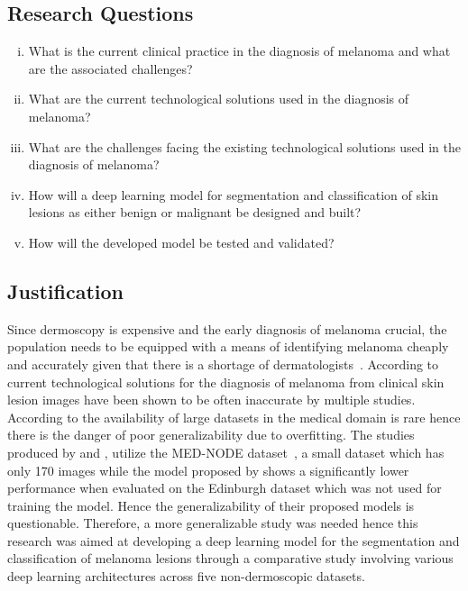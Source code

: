 \documentclass[12pt, a4paper]{article}
\begin{document}
\subsection{Research Questions}
\begin{enumerate}[(i)]
    \item What is the current clinical practice in the diagnosis of melanoma and what are the associated challenges?
    \item What are the current technological solutions used in the diagnosis of melanoma?
    \item What are the challenges facing the existing technological solutions used in the diagnosis of melanoma?
    \item How will a deep learning model for segmentation and classification of skin lesions as either benign or malignant be designed and built?
    \item How will the developed model be tested and validated?
\end{enumerate}
\subsection{Justification}
Since dermoscopy is expensive and the early diagnosis of melanoma crucial, the population needs to be equipped with a means of identifying melanoma cheaply and accurately given that there is a shortage of dermatologists~\citep{jones2019dermoscopy, davis2019current, giavina2020teledermatology}.
According to~\cite{davis2019current} current technological solutions for the diagnosis of melanoma from clinical skin lesion images have been shown to be often inaccurate by multiple studies. According to \cite{yoon2019generalizable} the availability of large datasets in the medical domain is rare hence there is the danger of poor generalizability due to overfitting. The studies produced by \cite{perez2021ensemble} and \cite{7590963}, utilize the MED-NODE dataset~\citep{giotis2015med}, a small dataset which has only 170 images while the model proposed by \cite{HAN20181529} shows a significantly lower performance when evaluated on the Edinburgh dataset which was not used for training the model. Hence the generalizability of their proposed models is questionable. Therefore, a more generalizable study was needed hence this research was aimed at developing a deep learning model for the segmentation and classification of melanoma lesions through a comparative study involving various deep learning architectures across five non-dermoscopic datasets.
\end{document}
